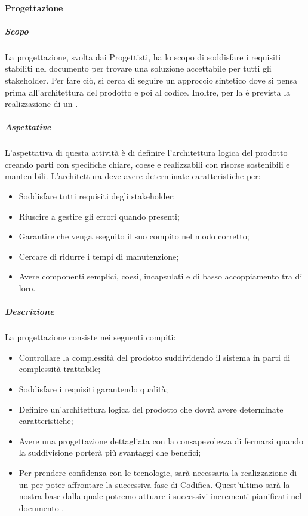 \paragraph{Progettazione}
\subparagraph*{Scopo}
La progettazione, svolta dai Progettisti, ha lo scopo di soddisfare i requisiti stabiliti nel documento \AdR{} per trovare una soluzione accettabile per tutti gli stakeholder.
Per fare ciò, si cerca di seguire un approccio sintetico dove si pensa prima all’architettura del prodotto e poi al codice. 
Inoltre, per la  è prevista la realizzazione di un .

\subparagraph*{Aspettative}
L'aspettativa di questa attività è di definire l’architettura logica del prodotto creando parti con specifiche chiare, coese e realizzabili con risorse sostenibili e mantenibili. L'architettura deve avere determinate caratteristiche per:
\begin{itemize}
	\item Soddisfare tutti requisiti degli stakeholder;
	\item Riuscire a gestire gli errori quando presenti;
	\item Garantire che venga eseguito il suo compito nel modo corretto;
	\item Cercare di ridurre i tempi di manutenzione;
	\item Avere componenti semplici, coesi, incapsulati e di basso accoppiamento tra di loro.
\end{itemize}

\subparagraph*{Descrizione}
La progettazione consiste nei seguenti compiti:
\begin{itemize}
	\item Controllare la complessità del prodotto suddividendo il sistema in parti di complessità trattabile;
	\item Soddisfare i requisiti garantendo qualità;
	\item Definire un’architettura logica del prodotto che dovrà avere determinate caratteristiche;
	\item Avere una progettazione dettagliata con la consapevolezza di fermarsi quando la suddivisione porterà più svantaggi che benefici;
	\item Per prendere confidenza con le tecnologie, sarà necessaria la realizzazione di un  per poter affrontare la successiva fase di Codifica. Quest'ultimo sarà la nostra base dalla quale potremo attuare i successivi incrementi pianificati nel documento \PdP{}.
\end{itemize}

